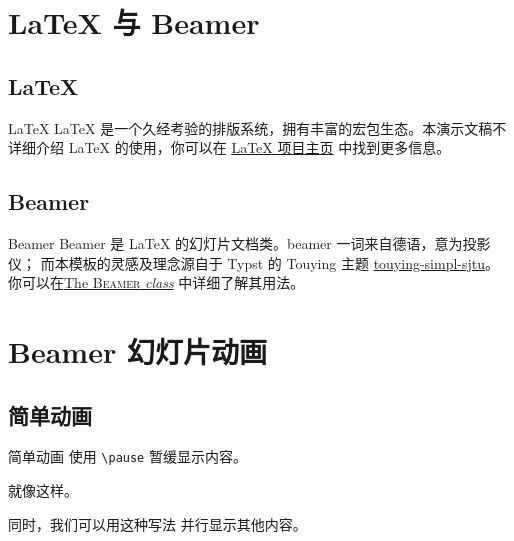 \documentclass[aspectratio=169]{ctexbeamer} %
\title{\themetitle}
\subtitle{V2.2026a}
\author{\themeauthor}
\date{\today}
\institute{哈尔滨工业大学}
\begin{document}
\TitleSlide

\OutlineSlide

\section{LaTeX 与 Beamer}

\subsection{LaTeX}

\begin{frame}{LaTeX}
  LaTeX 是一个久经考验的排版系统，拥有丰富的宏包生态。本演示文稿不详细介绍
  LaTeX 的使用，你可以在 \href{https://www.latex-project.org/}{LaTeX 项目主页}
  中找到更多信息。
\end{frame}

\subsection{Beamer}

\begin{frame}{Beamer}
  Beamer 是 LaTeX 的幻灯片文档类。beamer 一词来自德语，意为投影仪；
  而本模板的灵感及理念源自于 Typst 的 Touying 主题
  \href{https://github.com/sjtug/touying-sjtu}{touying-simpl-sjtu}。
  你可以在\href{https://latex.us/macros/latex/contrib/beamer/doc/beameruserguide.pdf}{The \textsc{Beamer} \textit{class}}
  中详细了解其用法。
  \parencite{beamer2026}
\end{frame}

\section{Beamer 幻灯片动画}

\subsection{简单动画}

\begin{frame}{简单动画}
  使用 \texttt{\textbackslash pause} \pause 暂缓显示内容。

  \pause
  就像这样。

  \setcounter{beamerpauses}{1}
  同时，\pause 我们可以用这种写法 \pause 并行显示其他内容。

\end{frame}
\end{document}
